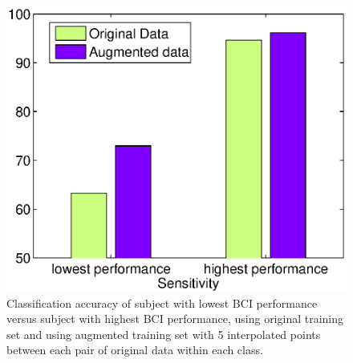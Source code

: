 \begin{figure}[ht!]
\vskip 0.2in
\begin{center}
\centerline{\includegraphics[width=0.95\columnwidth]{Figures/subjects_lowest_highest.eps}}
\caption{Classification accuracy of subject with lowest BCI performance versus subject with highest BCI performance, using original training set and using augmented training set with 5 interpolated points between each pair of original data within each class.}
\label{fig:lowest-highest}
\end{center}
\vskip -0.2in
\end{figure} 

